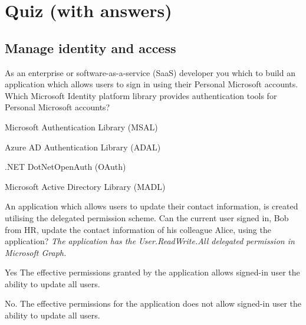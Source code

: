 \section{Quiz (with answers)}
\subsection{Manage identity and access}
As an enterprise or software-as-a-service (SaaS) developer you which to build an application which allows users to sign in using their Personal Microsoft accounts. Which Microsoft Identity platform library provides authentication tools for Personal Microsoft accounts?
\begin{todolist}
\item[\correct] Microsoft Authentication Library (MSAL)
\item[\incorrect] Azure AD Authentication Library (ADAL)
\item[\incorrect] .NET DotNetOpenAuth (OAuth)
\item[\incorrect] Microsoft Active Directory Library (MADL)
\end{todolist}
An application which allows users to update their contact information, is created utilising the delegated permission scheme. Can the current user signed in, Bob from HR, update the contact information of his colleague Alice, using the application? \textit{The application has the User.ReadWrite.All delegated permission in Microsoft Graph.}
\begin{todolist}
\item[\incorrect] Yes The effective permissions granted by the application allows signed-in user the ability to update all users. 
\item[\correct] No. The effective permissions for the application does not allow signed-in user the ability to update all users.
\end{todolist}